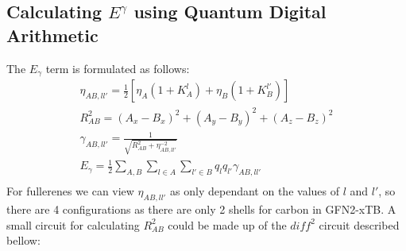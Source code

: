 \subsection{Calculating $E^\gamma$ using Quantum Digital Arithmetic}
The $E_\gamma$ term is formulated as follows:
\begin{gather}
    \eta_{AB,ll'} = \frac{1}{2}\left[\eta_A(1+K_A^l)+\eta_B(1+K_B^{l'})\right]\\
    R_{AB}^2 = (A_x-B_x)^2+(A_y-B_y)^2+(A_z-B_z)^2\\
    \gamma_{AB,ll'}=\frac{1}{\sqrt{R_{AB}^2+\eta_{AB,ll'}^{-2}}}\\
    E_\gamma=\frac{1}{2}\sum_{A,B}\sum_{l\in A}\sum_{l'\in B} q_lq_{l'}\gamma_{AB,ll'}\\
\end{gather}
For fullerenes we can view $\eta_{AB,ll'}$ as only dependant on the values of $l$ and $l'$, so there are 4 configurations as there are only 2 shells for carbon in GFN2-xTB. 
A small circuit for calculating $R_{AB}^2$ could be made up of the $diff^2$ circuit described bellow:

